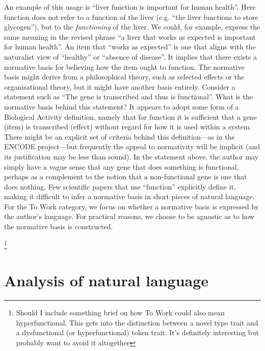 \documentclass{article}
\begin{document}
An example of this usage is ``liver function is important for human health''.
Here function does not refer to a function of the liver (e.g. ``the liver functions to store glycogen''), but to the \emph{functioning} of the liver.
We could, for example, express the same meaning in the revised phrase ``a liver that works as expected is important for human health''.
An item that ``works as expected'' is one that aligns with the naturalist view of ``healthy'' or ``absence of disease''.
It implies that there exists a normative basis for believing how the item ought to function.
The normative basis might derive from a philosophical theory, such as selected effects or the organisational theory, but it might have another basis entirely.
Consider a statement such as ``The gene is transcribed and thus is functional''.
What is the normative basis behind this statement?
It appears to adopt some form of a Biological Activity definition, namely that for function it is sufficient that a gene (item) is transcribed (effect) without regard for how it is used within a system.
There might be an explicit set of criteria behind this definition---as in the ENCODE project---but frequently the appeal to normativity will be implicit (and its justification may be less than sound).
In the statement above, the author may simply have a vague sense that any gene that does something is functional, perhaps as a complement to the notion that a non-functional gene is one that does nothing.
Few scientific papers that use ``function'' explicitly define it, making it difficult to infer a normative basis in short pieces of natural language.
For the To Work category, we focus on whether a normative basis is expressed by the author's language.
For practical reasons, we choose to be agnostic as to how the normative basis is constructed.

\footnote{Should I include something brief on how To Work could also mean hyperfunctional. This gets into the distinction between a novel type trait and a dysfunctional (or hyperfunctional) token trait. It's definitely interesting but probably want to avoid it altogether}

\section{Analysis of natural language}
\label{sec:analys-natur-lang}
\end{document}
